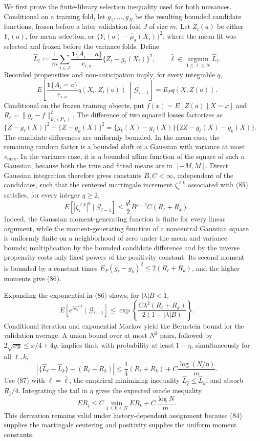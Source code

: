 We first prove the finite-library selection inequality used for both nuisances. Conditional on a training fold, let \(g_1,\ldots,g_N\) be the resulting bounded candidate functions, frozen before a later validation fold \(J\) of size \(m\). Let \(Z_i(a)\) be either \(Y_i(a)\), for mean selection, or \(\{Y_i(a)-\widehat\mu_a(X_i)\}^2\), where the mean fit was selected and frozen before the variance folds. Define
\[
\widehat L_\ell:=\frac1m\sum_{i\in J}
\frac{\mathbf1\{A_i=a\}}{e_{i,a}}
\{Z_i-g_\ell(X_i)\}^2,
\qquad
\widehat\ell\in\operatorname*{argmin}_{1\leq\ell\leq N}\widehat L_\ell.
\tag{83}
\]
Recorded propensities and non-anticipation imply, for every integrable \(q\),
\[
E\!\left[
\frac{\mathbf1\{A_i=a\}}{e_{i,a}}q(X_i,Z_i(a))
\,\middle|\,\mathcal G_{i-1}
\right]
=E_Pq(X,Z(a)).
\tag{84}
\]
Conditional on the frozen training objects, put \(f(x)=E[Z(a)\mid X=x]\) and \(R_\ell=\|g_\ell-f\|_{L_2(P_X)}^2\). The difference of two squared losses factorizes as
\[
\{Z-g_\ell(X)\}^2-\{Z-g_k(X)\}^2
=\{g_k(X)-g_\ell(X)\}\{2Z-g_\ell(X)-g_k(X)\}.
\tag{85}
\]
The candidate differences are uniformly bounded. In the mean case, the remaining random factor is a bounded shift of a Gaussian with variance at most \(v_{\max}\). In the variance case, it is a bounded affine function of the square of such a Gaussian, because both the true and fitted means are in \([-M,M]\). Direct Gaussian integration therefore gives constants \(B,C<\infty\), independent of the candidates, such that the centered martingale increment \(\zeta_i^{\ell k}\) associated with (85) satisfies, for every integer \(q\geq2\),
\[
E[|\zeta_i^{\ell k}|^q\mid\mathcal G_{i-1}]
\leq\frac{q!}{2}B^{q-2}C(R_\ell+R_k).
\tag{86}
\]
Indeed, the Gaussian moment-generating function is finite for every linear argument, while the moment-generating function of a noncentral Gaussian square is uniformly finite on a neighborhood of zero under the mean and variance bounds; multiplication by the bounded candidate difference and by the inverse propensity costs only fixed powers of the positivity constant. Its second moment is bounded by a constant times \(E_P(g_\ell-g_k)^2\leq2(R_\ell+R_k)\), and the higher moments give (86).

Expanding the exponential in (86) shows, for \(|\lambda|B<1\),
\[
E[e^{\lambda\zeta_i^{\ell k}}\mid\mathcal G_{i-1}]
\leq
\exp\!\left\{
\frac{C\lambda^2(R_\ell+R_k)}{2(1-|\lambda|B)}
\right\}.
\]
Conditional iteration and exponential Markov yield the Bernstein bound for the validation average. A union bound over at most \(N^2\) pairs, followed by \(2\sqrt{xy}\leq x/4+4y\), implies that, with probability at least \(1-\eta\), simultaneously for all \(\ell,k\),
\[
\left|\{\widehat L_\ell-\widehat L_k\}-(R_\ell-R_k)\right|
\leq\frac14(R_\ell+R_k)
+C\frac{\log(N/\eta)}m.
\tag{87}
\]
Use (87) with \(\ell=\widehat\ell\), the empirical minimizing inequality \(\widehat L_{\widehat\ell}\leq\widehat L_k\), and absorb \(R_{\widehat\ell}/4\). Integrating the tail in \(\eta\) gives the expected oracle inequality
\[
E R_{\widehat\ell}
\leq C\min_{1\leq k\leq N}ER_k
+C\frac{\log N}{m}.
\tag{88}
\]
This derivation remains valid under history-dependent assignment because (84) supplies the martingale centering and positivity supplies the uniform moment constants.

